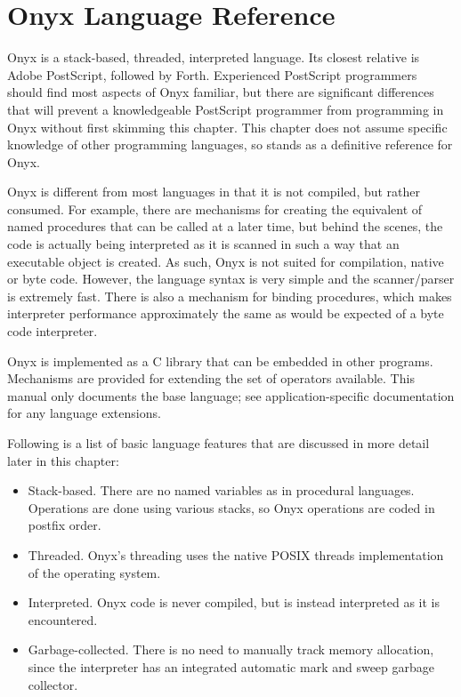 %
%
%
%
%

\clearemptydoublepage
\chapter{Onyx Language Reference}
\label{onyxlang}

Onyx is a stack-based, threaded, interpreted language.  Its closest relative is
Adobe PostScript, followed by Forth.  Experienced PostScript programmers should
find most aspects of Onyx familiar, but there are significant differences that
will prevent a knowledgeable PostScript programmer from programming in Onyx
without first skimming this chapter.  This chapter does not assume specific
knowledge of other programming languages, so stands as a definitive reference
for Onyx.

Onyx is different from most languages in that it is not compiled, but rather
consumed.  For example, there are mechanisms for creating the equivalent of
named procedures that can be called at a later time, but behind the scenes, the
code is actually being interpreted as it is scanned in such a way that an
executable object is created.  As such, Onyx is not suited for compilation,
native or byte code.  However, the language syntax is very simple and the
scanner/parser is extremely fast.  There is also a mechanism for binding
procedures, which makes interpreter performance approximately the same as would
be expected of a byte code interpreter.

Onyx is implemented as a C library that can be embedded in other programs.
Mechanisms are provided for extending the set of operators available.  This
manual only documents the base language; see application-specific documentation
for any language extensions.

Following is a list of basic language features that are discussed in more detail
later in this chapter:

\begin{itemize}
\item{Stack-based.  There are no named variables as in procedural languages.
Operations are done using various stacks, so Onyx operations are coded in
postfix order.}
\item{Threaded.  Onyx's threading uses the native POSIX threads implementation
of the operating system.}
\item{Interpreted.  Onyx code is never compiled, but is instead interpreted as
it is encountered.}
\item{Garbage-collected.  There is no need to manually track memory allocation,
since the interpreter has an integrated automatic mark and sweep garbage
collector.}
\end{itemize}

